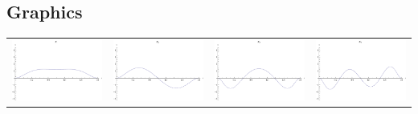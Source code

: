 \documentclass{article}
\begin{document}
\begin{landscape}
\subsection{Graphics}
\begin{tabular}{cccc}
\includegraphics[width=5.0cm]{decic_bspline_1.pdf}& \includegraphics[width=5.0cm]{decic_bspline_2.pdf}& \includegraphics[width=5.0cm]{decic_bspline_3.pdf}& \includegraphics[width=5.0cm]{decic_bspline_4.pdf} \\

\end{tabular}
\end{landscape}
\end{document}
